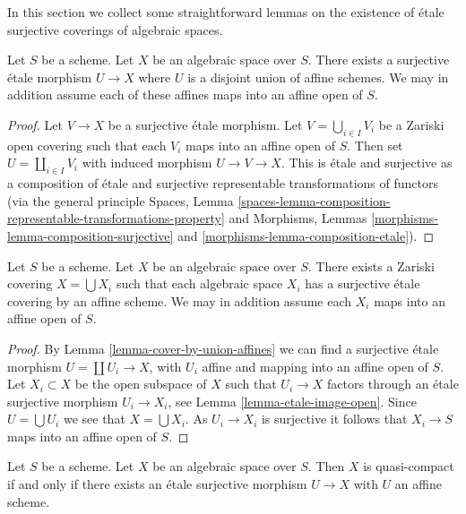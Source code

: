 \noindent
In this section we collect some straightforward lemmas on the existence
of \'etale surjective coverings of algebraic spaces.

\begin{lemma}
\label{lemma-cover-by-union-affines}
Let $S$ be a scheme.
Let $X$ be an algebraic space over $S$.
There exists a surjective \'etale morphism $U \to X$ where
$U$ is a disjoint union of affine schemes.
We may in addition assume each of these affines
maps into an affine open of $S$.
\end{lemma}

\begin{proof}
Let $V \to X$ be a surjective \'etale morphism.
Let $V = \bigcup_{i \in I} V_i$ be a Zariski open covering
such that each $V_i$ maps into an affine open of $S$.
Then set $U = \coprod_{i \in I} V_i$ with induced morphism
$U \to V \to X$. This is \'etale and surjective as a composition
of \'etale and surjective representable
transformations of functors (via the general principle
Spaces, Lemma
\ref{spaces-lemma-composition-representable-transformations-property}
and
Morphisms, Lemmas \ref{morphisms-lemma-composition-surjective} and
\ref{morphisms-lemma-composition-etale}).
\end{proof}

\begin{lemma}
\label{lemma-union-of-quasi-compact}
Let $S$ be a scheme.
Let $X$ be an algebraic space over $S$.
There exists a Zariski covering $X = \bigcup X_i$
such that each algebraic space $X_i$ has a surjective
\'etale covering by an affine scheme. We may in addition assume
each $X_i$ maps into an affine open of $S$.
\end{lemma}

\begin{proof}
By Lemma \ref{lemma-cover-by-union-affines} we can find a surjective
\'etale morphism $U = \coprod U_i \to X$, with $U_i$ affine and mapping
into an affine open of $S$. Let $X_i \subset X$ be the open subspace
of $X$ such that $U_i \to X$ factors through an \'etale surjective morphism
$U_i \to X_i$, see
Lemma \ref{lemma-etale-image-open}.
Since $U = \bigcup U_i$ we see that $X = \bigcup X_i$.
As $U_i \to X_i$ is surjective it follows that $X_i \to S$ maps into
an affine open of $S$.
\end{proof}

\begin{lemma}
\label{lemma-quasi-compact-affine-cover}
Let $S$ be a scheme.
Let $X$ be an algebraic space over $S$.
Then $X$ is quasi-compact if and only if
there exists an \'etale surjective morphism $U \to X$
with $U$ an affine scheme.
\end{lemma}

